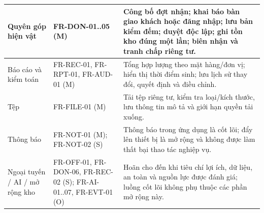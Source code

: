 \documentclass[12pt,a4paper,oneside]{report}
\begin{document}
\begin{longtable}{|L{2.7cm}|L{2.4cm}|L{9.5cm}|}
    Quyên góp hiện vật & FR-DON-01..05 (M) & Công bố đợt nhận; khai báo bàn giao khách hoặc đăng nhập; lưu bản kiểm đếm; duyệt độc lập; ghi tồn kho đúng một lần; biên nhận và tranh chấp riêng tư. \\
    \hline
    Báo cáo và kiểm toán & FR-REC-01, FR-RPT-01, FR-AUD-01 (M) & Tổng hợp lượng theo mặt hàng/đơn vị; hiển thị thời điểm sinh; lưu lịch sử thay đổi, quyết định và điều chỉnh. \\
    \hline
    Tệp & FR-FILE-01 (M) & Tải tệp riêng tư, kiểm tra loại/kích thước, lưu thông tin mô tả và giới hạn quyền tải xuống. \\
    \hline
    Thông báo & FR-NOT-01 (M); FR-NOT-02 (S) & Thông báo trong ứng dụng là cốt lõi; đẩy lên thiết bị là mở rộng và không được làm thất bại thao tác nghiệp vụ. \\
    \hline
    Ngoại tuyến / AI / mở rộng kho & FR-OFF-01, FR-DON-06, FR-REC-02 (S); FR-AI-01..07, FR-EVT-01 (O) & Hoãn cho đến khi tiêu chí lợi ích, dữ liệu, an toàn và nguồn lực được đánh giá; luồng cốt lõi không phụ thuộc các phần mở rộng này. \\
    \hline
\end{longtable}
\normalsize
\end{document}
